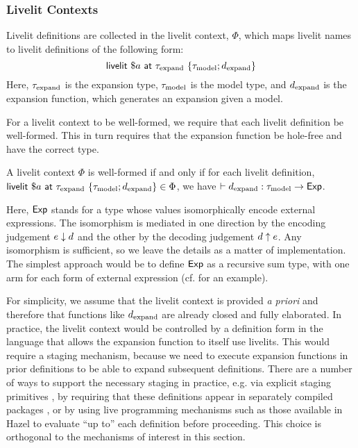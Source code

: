\subsubsection{Livelit Contexts}
Livelit definitions are collected in the livelit context, $\Phi$, which
maps livelit names to livelit definitions of the following form:
\[ \mathsf{livelit}~\$a~\mathsf{at}~\tau_\text{expand}~\{\tau_\text{model}; d_\text{expand}\} \]
Here, $\tau_\text{expand}$ is the expansion type, $\tau_\text{model}$ is the model type,
and $d_\text{expand}$ is the expansion function, which generates an expansion given a model.

For a livelit context to be well-formed, we require that each livelit definition be well-formed. 
This in turn requires that the expansion function be hole-free and have the correct type.
\begin{definition}
    A livelit context $\Phi$ is well-formed if and only if for each livelit definition, 
    $\mathsf{livelit}~\$a~\mathsf{at}~\tau_\text{expand}~\{\tau_\text{model}; d_\text{expand}\} \in \Phi$,  we have
    $\vdash d_\text{expand} : \tau_\text{model} \rightarrow \mathsf{Exp}$.
\end{definition}
Here, $\mathsf{Exp}$ stands for a type whose values isomorphically encode 
external expressions. The isomorphism is mediated in one direction by 
the encoding judgement $e \downarrow d$ and the other by the decoding judgement $d \uparrow e$.
Any isomorphism is sufficient, so we leave the details as a matter of implementation.
The simplest approach would be to define $\mathsf{Exp}$ as a recursive sum type,
with one arm for each form of external expression (cf. \cite{TSLs} for an example).

For simplicity, we assume that the livelit context is provided \emph{a priori} and therefore 
that functions like $d_\text{expand}$ are already closed and fully elaborated.
In practice, the livelit context would be controlled by a definition form in the language
that allows the expansion function to itself use livelits.
This would require a staging mechanism,
because we need to execute expansion functions in prior definitions to be able to 
expand subsequent definitions.
There are a number of ways to support the necessary staging in practice, e.g. 
via explicit staging primitives ,
by requiring that these definitions appear in separately compiled packages \cite{TLMs}, 
or by using live
programming mechanisms such as those available in Hazel 
to evaluate ``up to'' each definition before proceeding.
This choice is orthogonal to the mechanisms of interest in this section.

